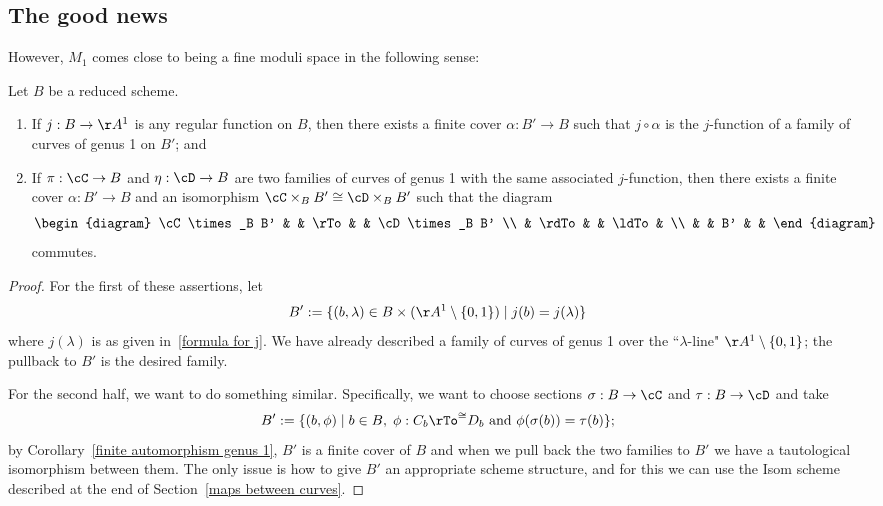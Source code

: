 \subsection{The good news}

However, $M_1$ comes close to being a fine moduli space in the following sense:

\begin{proposition}\label{families on pullbacks} Let $B$ be a reduced scheme.
\begin{enumerate}
\item If $j : B \to \AA^1$ is any regular function on $B$, then there exists a finite cover $\alpha : B' \to B$ such that $j \circ \alpha$ is the $j$-function of a family of curves of genus 1 on $B'$; and
\item If $\pi : \cC \to B$ and $\eta : \cD \to B$ are two families of curves of genus 1 with the same associated $j$-function, then there exists a finite cover $\alpha : B' \to B$ and an isomorphism $\cC \times_B B' \cong \cD \times_B B'$ such that the diagram
$$
\begin{diagram}
\cC \times_B B' & & \rTo & & \cD \times_B B' \\
& \rdTo & & \ldTo & \\
& & B' & &
\end{diagram} 
$$
commutes.
\end{enumerate}
\end{proposition}

\begin{proof} For the first of these assertions, let
$$
B' := \{(b, \lambda) \in B \times (\AA^1 \setminus \{0,1\}) \mid j(b) = j(\lambda)\}
$$
where $j(\lambda)$ is as given in~\ref{formula for j}. We have already described a family of curves of genus 1 over the ``$\lambda$-line" $\AA^1 \setminus \{0,1\}$; the pullback to $B'$ is the desired family.

For the second half, we want to do something similar. Specifically, we want to choose sections $\sigma : B \to \cC$ and $\tau: B \to \cD$ and take
$$
B' := \{ (b, \phi) \mid b \in B, \; \phi : C_b \rTo^{\cong} D_b  \text{ and } \phi(\sigma(b)) = \tau(b) \};
$$
by Corollary~\ref{finite automorphism genus 1}, $B'$ is a finite cover of $B$ and when we pull back the two families to $B'$ we have a tautological isomorphism between them. The only issue is how to give $B'$ an appropriate scheme structure, and for this we can use the Isom scheme described at the end of Section~\ref{maps between curves}.
\end{proof}

